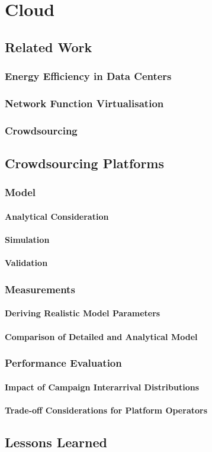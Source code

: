 \chapter{Cloud}\label{chap:cloud}

\section{Related Work}
\subsection{Energy Efficiency in Data Centers}
\subsection{Network Function Virtualisation}
\subsection{Crowdsourcing}




\section{Crowdsourcing Platforms}
\cite{Schwartz2015}
\subsection{Model}
\subsubsection*{Analytical Consideration}
\subsubsection*{Simulation}
\subsubsection*{Validation}
\subsection{Measurements}
\subsubsection*{Deriving Realistic Model Parameters}
\subsubsection*{Comparison of Detailed and Analytical Model}
\subsection{Performance Evaluation}
\subsubsection*{Impact of Campaign Interarrival Distributions}
\subsubsection*{Trade-off Considerations for Platform Operators}

\section{Lessons Learned}